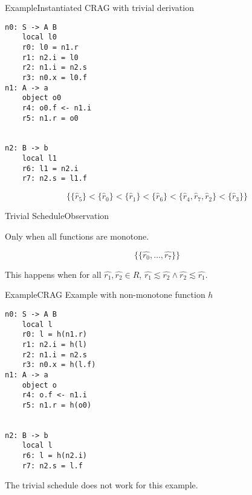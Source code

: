 \begin{frame}[fragile=singleslide]{Example}{Instantiated CRAG with trivial derivation}

\begin{multicols}{3}
\begin{Verbatim}[fontsize=\small]
n0: S -> A B
    local l0
    r0: l0 = n1.r
    r1: n2.i = l0
    r2: n1.i = n2.s
    r3: n0.x = l0.f
n1: A -> a
    object o0
    r4: o0.f <- n1.i
    r5: n1.r = o0


n2: B -> b
    local l1
    r6: l1 = n2.i
    r7: n2.s = l1.f
\end{Verbatim}
\end{multicols}

\[
     \Big \{ \{ \hat{r}_5 \} < \{ \hat{r}_0 \} < \{ \hat{r}_1 \} < \{ \hat{r}_6 \} < \{ \hat{r}_4 , \hat{r}_7, \hat{r}_2 \} < \{ \hat{r}_3 \}  \Big \}
\]

\end{frame}


\begin{frame}{Trivial Schedule}{Observation}

Only when \alert{all functions are monotone}. 

$$ \Big\{ \{ \hat{r_0}, \dots, \hat{r_7} \} \Big \}$$

This happens when for all $\hat{r_1}, \hat{r_2} \in \hat{R}$, $\hat{r_1} \lesssim \hat{r_2} \wedge \hat{r_2} \lesssim \hat{r_1}$.

\end{frame}



\begin{frame}[fragile=singleslide]{Example}{CRAG Example with non-monotone function $h$}

\begin{multicols}{3}
\begin{Verbatim}[fontsize=\small]
n0: S -> A B
    local l
    r0: l = h(n1.r)
    r1: n2.i = h(l)
    r2: n1.i = n2.s
    r3: n0.x = h(l.f)
n1: A -> a
    object o
    r4: o.f <- n1.i
    r5: n1.r = h(o0)


n2: B -> b
    local l
    r6: l = h(n2.i)
    r7: n2.s = l.f
\end{Verbatim}
\end{multicols}



\newlinevspace

The trivial schedule \alert{does not work} for this example.

\end{frame}



